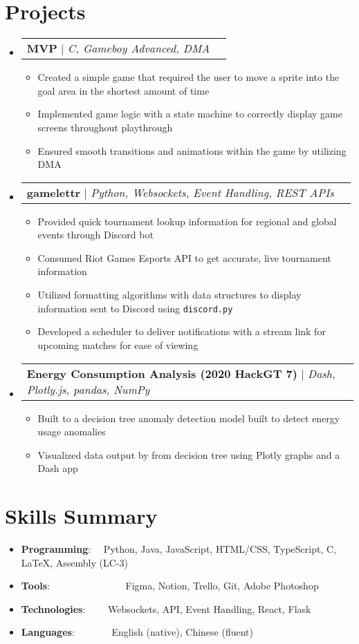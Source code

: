 \documentclass[a4paper,11pt]{extarticle}
\makeatletter
\newcommand{\resumeSkillItem}[2]{
	\item\small{
		\textbf{#1}{: #2 \vspace{-2pt}}
	}
}
\newcommand{\resumeItem}[1]{
	\item\small{
		#1 \vspace{-1pt}
	}
}
\newcommand{\resumeProjectHeading}[3]{
	\vspace{-3pt}\item
		\begin{tabular*}{1\linewidth}{l@{\extracolsep{\fill}}r}
			\textbf{#1} $|$ \emph{#2} & #3 \\
		\end{tabular*}\vspace{-3pt}
}
\newcommand{\resumeSubItem}[2]{\resumeSkillItem{#1}{#2}\vspace{-5pt}}
\newcommand{\resumeSubHeadingListStart}{\begin{itemize}[leftmargin=0.15in,label={}]}
\newcommand{\resumeSubHeadingListEnd}{\end{itemize}}
\newcommand{\resumeItemListStart}{\begin{itemize}\vspace{-3pt}}
\newcommand{\resumeItemListEnd}{\end{itemize}\vspace{-3pt}}
\makeatother
\begin{document}
\section{Projects}
    \resumeSubHeadingListStart
    \vspace{1mm}
        \resumeProjectHeading
            {MVP}
            {C, Gameboy Advanced, DMA}
            {}
            \resumeItemListStart
                \resumeItem{Created a simple game that required the user to move
                    a sprite into the goal area in the shortest amount of time}
                \resumeItem{Implemented game logic with a state machine to correctly
                    display game screens throughout playthrough}
                \resumeItem{Ensured smooth transitions and animations within the game
                    by utilizing DMA}
            \resumeItemListEnd

        \resumeProjectHeading
            {gamelettr}
            {Python, Websockets, Event Handling, REST APIs}
            {}
            \resumeItemListStart
                \resumeItem{Provided quick tournament lookup information for
                    regional and global events through Discord bot}
                \resumeItem{Consumed Riot Games Esports API to get accurate, live
                    tournament information}
                \resumeItem{Utilized formatting algorithms with data structures to
                    display information sent to Discord using \texttt{discord.py}}
                \resumeItem{Developed a scheduler to deliver notifications with
                    a stream link for upcoming matches for ease of viewing}
            \resumeItemListEnd

        \resumeProjectHeading
            {Energy Consumption Analysis (2020 HackGT 7)}
            {Dash, Plotly.js, pandas, NumPy}
            {}
            \resumeItemListStart
                \resumeItem{Built to a decision tree anomaly detection model
                    built to detect energy usage anomalies}
                \resumeItem{Visualized data output by from decision tree using Plotly
                    graphs and a Dash app}
            \resumeItemListEnd
    \resumeSubHeadingListEnd

\section{Skills Summary}
	\resumeSubHeadingListStart
		\resumeSubItem{Programming}
			{\hspace{0.6mm}~~Python, Java, JavaScript, HTML/CSS, TypeScript, C, \LaTeX, Assembly (LC-3)}
		\resumeSubItem{Tools}
            {\hspace{0.3mm}~~~~~~~~~~~~~~~Figma, Notion, Trello, Git, Adobe
                Photoshop}
		\resumeSubItem{Technologies}
			{~~~~Websockets, API, Event Handling, React, Flask}
        \resumeSubItem{Languages}
			{\hspace{0.6mm}~~~~~~~English (native), Chinese (fluent)}
	\resumeSubHeadingListEnd
\end{document}
